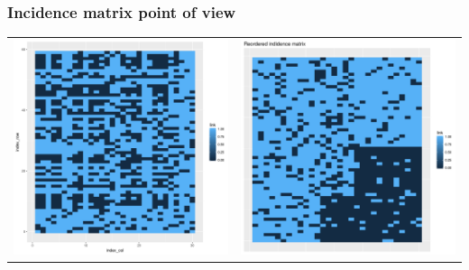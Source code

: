 \documentclass[nopagenumber,9pt]{beamer}
\begin{document}
\begin{frame}\frametitle{Incidence matrix point of view}

\centering
\begin{tabular}{cc}
 \includegraphics[scale=.2]{plots/lbm/Nested_adja.png}&
\includegraphics[scale=.2]{plots/lbm/Nested_reordered_adja_without_groups.png}
 \end{tabular}
 
 

\end{frame}
\end{document}
